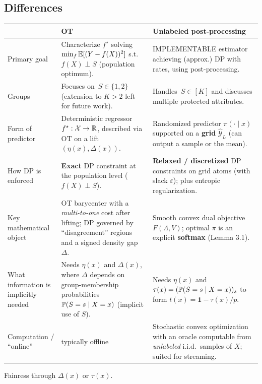 \documentclass[11pt]{article}
\begin{document}
\subsection*{Differences}
\begin{center}
\begin{tabular}{@{}p{3.2cm}p{6.2cm}p{6.2cm}@{}}
\toprule
 & \textbf{OT} & \textbf{Unlabeled post-processing} \\
\midrule
Primary goal
& Characterize $f^\star$ solving \(\min_f \mathbb{E}[(Y-f(X))^2]\) s.t.\ \(f(X)\perp S\) (population optimum).
& IMPLEMENTABLE estimator achieving (approx.) DP with rates, using post-processing. \\
\addlinespace
Groups
& Focuses on \(\,S\in\{1,2\}\) (extension to $K>2$ left for future work).
& Handles \(\,S\in[K]\) and discusses multiple protected attributes. \\
\addlinespace
Form of predictor
& Deterministic regressor \(f^\star:\mathcal{X}\to\mathbb{R}\), described via OT on a lift \((\eta(x),\Delta(x))\).
& Randomized predictor \(\pi(\cdot\mid x)\) supported on a \textbf{grid} \(\widehat{\mathcal Y}_L\) (can output a sample or the mean). \\
\addlinespace
How DP is enforced
& \textbf{Exact} DP constraint at the population level (\(f(X)\perp S\)).
& \textbf{Relaxed / discretized} DP constraints on grid atoms (with slack \(\varepsilon\)); plus entropic regularization. \\
\addlinespace
Key mathematical object
& OT barycenter with a \emph{multi-to-one} cost after lifting; DP governed by ``disagreement'' regions and a signed density gap \(\Delta\).
& Smooth convex dual objective \(F(\Lambda,V)\); optimal \(\pi\) is an explicit \textbf{softmax} (Lemma 3.1). \\
\addlinespace
What information is implicitly needed
& Needs \(\eta(x)\) and \(\Delta(x)\), where \(\Delta\) depends on group-membership probabilities \(\mathbb{P}(S=s\mid X=x)\) (implicit use of $S$).
& Needs \(\eta(x)\) and \(\tau(x)=(\mathbb{P}(S=s\mid X=x))_{s}\) to form \(t(x)=\mathbf{1}-\tau(x)/p\). \\
\addlinespace
Computation / “online”
& typically offline
& Stochastic convex optimization with an oracle computable from \emph{unlabeled} i.i.d.\ samples of \(X\); suited for streaming. \\
\bottomrule
\end{tabular}
\end{center}

Fainress through $\Delta(x)$ or $\tau(x)$.
\end{document}
